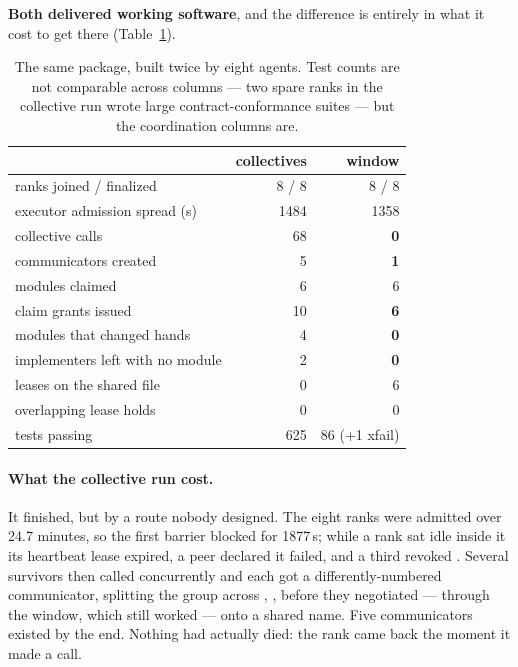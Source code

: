 \textbf{Both delivered working software}, and the difference is entirely in
what it cost to get there (Table~\ref{tab:software}).

\begin{table}[t]
\centering
\small
\caption{The same package, built twice by eight agents. Test counts are not
comparable across columns --- two spare ranks in the collective run wrote large
contract-conformance suites --- but the coordination columns are.}
\label{tab:software}
\begin{tabular}{@{}lrr@{}}
\toprule
 & collectives & window \\
\midrule
ranks joined / finalized      & 8 / 8   & 8 / 8 \\
executor admission spread (s) & 1484    & 1358 \\
collective calls              & 68      & \textbf{0} \\
communicators created         & 5       & \textbf{1} \\
modules claimed               & 6       & 6 \\
claim grants issued           & 10      & \textbf{6} \\
modules that changed hands    & 4       & \textbf{0} \\
implementers left with no module & 2    & \textbf{0} \\
leases on the shared file     & 0       & 6 \\
overlapping lease holds       & 0       & 0 \\
tests passing                 & 625     & 86 (+1 xfail) \\
\bottomrule
\end{tabular}
\end{table}

\paragraph{What the collective run cost.}  It finished, but by a route nobody
designed.  The eight ranks were admitted over 24.7 minutes, so the first
barrier blocked for 1877\,s; while a rank sat idle inside it its heartbeat
lease expired, a peer declared it failed, and a third revoked .
Several survivors then called  concurrently and each
got a differently-numbered communicator, splitting the group across
, ,  before they negotiated --- through
the window, which still worked --- onto a shared name.  Five communicators
existed by the end.  Nothing had actually died: the rank came back the moment
it made a call.

